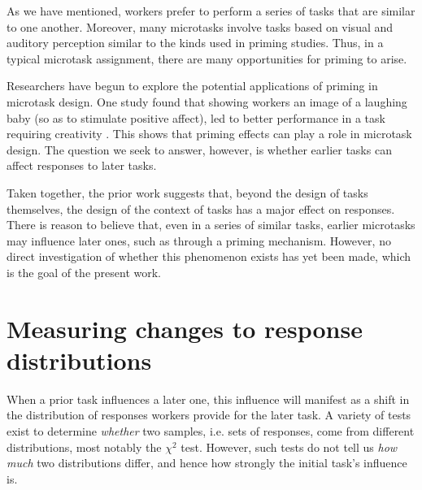 \documentclass{sigchi}
\begin{document}
As we have mentioned, workers prefer to perform a series of tasks that
are similar to one another.  Moreover, many 
microtasks involve tasks based on visual and auditory perception 
similar to the kinds used in priming studies.
Thus, in a typical microtask assignment, there are many opportunities for 
priming to arise.  

Researchers have begun to explore the potential 
applications of priming in microtask design.  One study found that 
showing workers an image of a laughing baby (so as to stimulate positive
affect), led to better performance in a task requiring creativity
\cite{lewis2011affective}.  This shows that priming effects can play a 
role in microtask design.  The question we seek to answer, however, is 
whether earlier tasks can affect responses to later tasks.

Taken together, the prior work suggests that, beyond the design
of tasks themselves, the design of the context of tasks has a major
effect on responses.  There is reason to believe that, even in a series
of similar tasks, earlier microtasks may influence later ones, such as
through a priming mechanism.  However, no direct investigation of whether 
this phenomenon exists has yet been made, which is the goal of the present 
work.

\section{Measuring changes to response distributions}
When a prior task influences a later one, this influence will manifest as
a shift in the distribution of responses workers provide for the later 
task.
A variety of tests exist to determine \textit{whether} two samples, 
i.e. sets of responses, come from different distributions, 
most notably the $\chi^2$ test.  
However, such tests
do not tell us \textit{how much} two distributions differ, and hence
how strongly the initial task's influence is.
\end{document}
